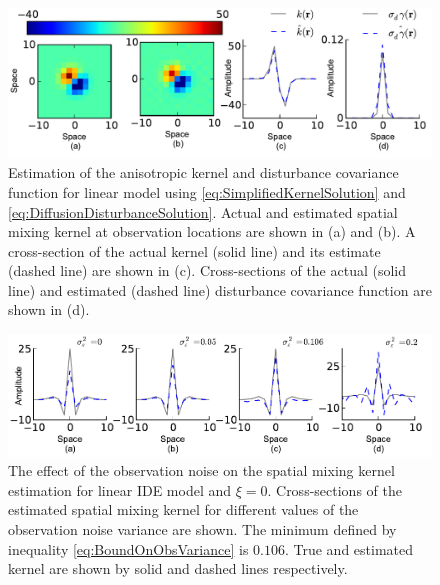 \documentclass[10pt,twocolumn,twoside]{IEEEtran}
\begin{document}
\begin{figure}[ht]
	\centering
		\includegraphics[scale=1]{./Graph/DisturbanceKernelEstimationLinearAniso.pdf}
	\caption{Estimation of the anisotropic kernel and disturbance covariance function for linear model using \eqref{eq:SimplifiedKernelSolution} and \eqref{eq:DiffusionDisturbanceSolution}. Actual and  estimated spatial mixing kernel at observation locations are shown in (a) and (b).  A cross-section of the actual kernel (solid line) and its estimate  (dashed line) are shown in (c). Cross-sections of the actual (solid line) and estimated (dashed line) disturbance covariance function are shown in (d).}
	\label{fig:DifussionAniso}
\end{figure}  
 

\begin{figure}[ht]
	\centering
		\includegraphics[scale=1]{./Graph/NoiseEffectIsoKernel.pdf}
	\caption{The effect of the observation noise on the spatial mixing kernel estimation for linear IDE model and $\xi=0$. Cross-sections of the estimated spatial mixing kernel for different values of the observation noise variance are shown. The minimum defined by inequality \eqref{eq:BoundOnObsVariance} is $0.106$. True and estimated kernel are shown by solid and dashed lines respectively.}
	\label{fig:ObservationNoiseEffectonLinearIDE}
\end{figure}
\end{document}
